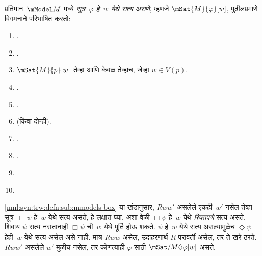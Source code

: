 \begin{defn}\label{nml:syn:trw:defn:mmodels}
  प्रतिमान~$\mModel M$ मध्ये \emph{सूत्र~$\varphi$ हे~$w$ येथे
  सत्य असणे}, म्हणजे $\mSat{M}{\varphi}[w]$, पुढीलप्रमाणे
  विगमनाने परिभाषित करतो:
  \begin{enumerate}
  \item {}.
  \item {}.
  \item $\mSat{M}{p}[w]$ तेव्हा आणि केवळ तेव्हाच, जेव्हा $w \in V(p)$.
  \item {}.
  \item {}.
  \item {} (किंवा दोन्ही).
  \item {}.
  \item {}.
  \item\label{nml:syn:trw:defn:sub:mmodels-box}
  \item\label{nml:syn:trw:defn:sub:mmodels-diamond}
  \end{enumerate}
\end{defn}

\ref{nml:syn:trw:defn:sub:mmodels-box} या खंडानुसार, $Rww'$ असलेले
एकही~$w'$ नसेल तेव्हा सूत्र~$\Box \psi$ हे~$w$ येथे
सत्य असते, हे लक्षात घ्या. अशा वेळी $\Box \psi$ हे~$w$ येथे
\emph{रिक्तपणे} सत्य असते. शिवाय $\psi$ सत्य नसतानाही
$\Box \psi$ ची~$w$ येथे पूर्ति होऊ शकते. $\psi$ हे~$w$ येथे
सत्य असल्यामुळेच $\Diamond \psi$ हेही~$w$ येथे सत्य असेल
असे नाही. मात्र $Rww$ असेल, उदाहरणार्थ $R$ परावर्ती असेल,
तर ते खरे ठरते. $Rww'$ असलेले $w'$ मुळीच नसेल, तर कोणत्याही
$\varphi$ साठी $\mSat/{M}{\Diamond \varphi}[w]$ असते.

